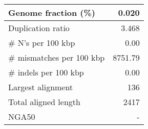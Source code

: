 \documentclass[12pt,a4paper]{article}
\begin{document}
\begin{table}[ht]
\begin{center}
\begin{tabular}{|l*{1}{|r}|}
Genome fraction (\%) & 0.020 \\ \hline
Duplication ratio & 3.468 \\ \hline
\# N's per 100 kbp & 0.00 \\ \hline
\# mismatches per 100 kbp & 8751.79 \\ \hline
\# indels per 100 kbp & 0.00 \\ \hline
Largest alignment & 136 \\ \hline
Total aligned length & 2417 \\ \hline
NGA50 & - \\ \hline
\end{tabular}
\end{center}
\end{table}
\end{document}
